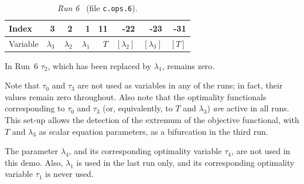 \documentclass[12pt]{report}
\begin{document}
\begin{table}[htbp]
\begin{center}
\begin{tabular}{| l | r | r | r | r | r | r | r |}
\hline
  Index& 3 & ~2 & ~1 & 11  & -22 & -23 & -31 \\
\hline
  Variable& $\lambda_3$ & $\lambda_2$ & $\lambda_1$ & $T$  
  & $[\lambda_2]$ & $[\lambda_3]$ & $[T]$ \\
\hline
\end{tabular}
\caption{{\it Run 6}~ (file {\tt c.ops.6}).}
\label{tbl:demo_ops_3}
\end{center}
\end{table}


In Run~6 $\tau_2$, which has been replaced by $\lambda_1$, remains zero.


Note that $\tau_0$ and $\tau_3$ are not used as variables in any
of the runs; in fact, their values remain zero throughout.
Also note that the optimality functionals corresponding to 
$\tau_0$ and $\tau_3$ (or, equivalently, to $T$ and $\lambda_3$) 
{\it are} active in all runs.
This set-up allows the detection of the extremum of the objective functional,
with $T$ and $\lambda_3$ as scalar equation parameters,
as a bifurcation in the third run.

The parameter $\lambda_4$, and its corresponding optimality variable $\tau_4$,
are not used in this demo.
Also, $\lambda_1$ is used in the last run only, and its corresponding 
optimality variable $\tau_1$ is never used.
\end{document}
